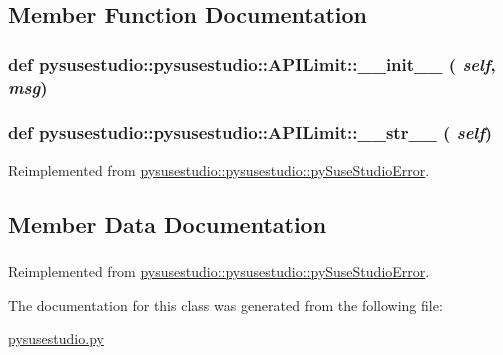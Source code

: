 \subsection{Member Function Documentation}
\hypertarget{classpysusestudio_1_1pysusestudio_1_1_a_p_i_limit_a27e923705519ee58d3eb37d930045e49}{
\subsubsection[{\_\-\_\-init\_\-\_\-}]{\setlength{\rightskip}{0pt plus 5cm}def pysusestudio::pysusestudio::APILimit::\_\-\_\-init\_\-\_\- ( {\em self}, \/   {\em msg})}}
\label{classpysusestudio_1_1pysusestudio_1_1_a_p_i_limit_a27e923705519ee58d3eb37d930045e49}
\hypertarget{classpysusestudio_1_1pysusestudio_1_1_a_p_i_limit_a1276e9098dc88e6f270eb66149a219fa}{
\subsubsection[{\_\-\_\-str\_\-\_\-}]{\setlength{\rightskip}{0pt plus 5cm}def pysusestudio::pysusestudio::APILimit::\_\-\_\-str\_\-\_\- ( {\em self})}}
\label{classpysusestudio_1_1pysusestudio_1_1_a_p_i_limit_a1276e9098dc88e6f270eb66149a219fa}


Reimplemented from \hyperlink{classpysusestudio_1_1pysusestudio_1_1py_suse_studio_error_a117b0e3520484fdd941246f2a1bf9345}{pysusestudio::pysusestudio::pySuseStudioError}.

\subsection{Member Data Documentation}
\hypertarget{classpysusestudio_1_1pysusestudio_1_1_a_p_i_limit_a0b841d2d35e949aafd2d2b2c7eb35bee}{
\subsubsection[{msg}]{}}
\label{classpysusestudio_1_1pysusestudio_1_1_a_p_i_limit_a0b841d2d35e949aafd2d2b2c7eb35bee}


Reimplemented from \hyperlink{classpysusestudio_1_1pysusestudio_1_1py_suse_studio_error_ad793aaac43eed7419fc64adfba1d2b0f}{pysusestudio::pysusestudio::pySuseStudioError}.

The documentation for this class was generated from the following file:\begin{DoxyCompactItemize}
\item 
\hyperlink{pysusestudio_8py}{pysusestudio.py}\end{DoxyCompactItemize}
